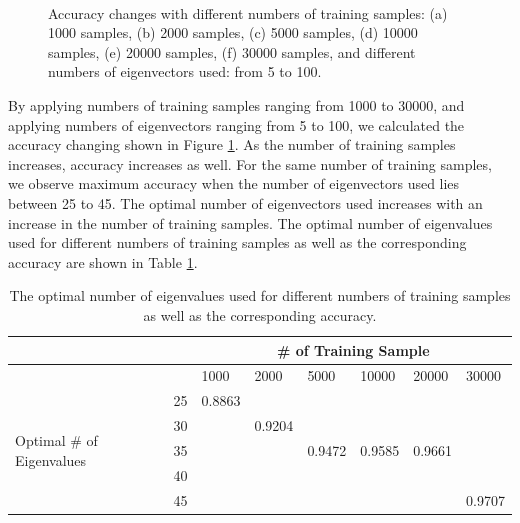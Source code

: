 \documentclass[UTF8,12pt]{article}
\begin{document}
\begin{figure}[!ht]
		\\
		\caption{\label{fig:accuracy} Accuracy changes with different numbers of training samples: (a) 1000 samples, (b) 2000 samples, (c) 5000 samples, (d) 10000 samples, (e) 20000 samples, (f) 30000 samples, and different numbers of eigenvectors used: from 5 to 100.}
	\end{figure}
	By applying numbers of training samples ranging from 1000 to 30000, and applying numbers of eigenvectors ranging from 5 to 100, we calculated the accuracy changing shown in Figure \ref{fig:accuracy}. As the number of training samples increases, accuracy increases as well. For the same number of training samples, we observe maximum accuracy when the number of eigenvectors used lies between 25 to 45. The optimal number of eigenvectors used increases with an increase in the number of training samples. The optimal number of eigenvalues used for different numbers of training samples as well as the corresponding accuracy are shown in Table \ref{table:accuracy}.
	\begin{table}[]
		\begin{tabular}{l|l|llllll}
			\hline
			&    & \multicolumn{6}{c}{\# of Training Sample}           \\\hline
			&    & 1000   & 2000   & 5000   & 10000  & 20000  & 30000  \\\hline
			\multirow{5}{*}{Optimal \# of Eigenvalues} & 25 & 0.8863 &        &        &        &        &        \\
			& 30 &        & 0.9204 &        &        &        &        \\
			& 35 &        &        & 0.9472 & 0.9585 & 0.9661 &        \\
			& 40 &        &        &        &        &        &        \\
			& 45 &        &        &        &        &        & 0.9707 \\\hline
		\end{tabular}
	\caption{\label{table:accuracy}The optimal number of eigenvalues used for different numbers of training samples as well as the corresponding accuracy.}
	\end{table}
\end{document}
